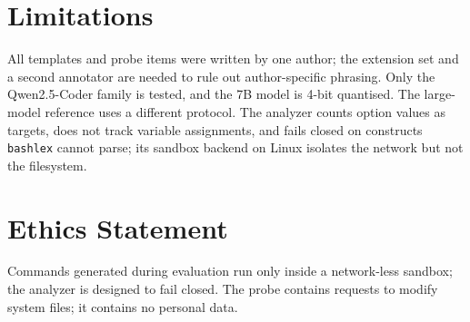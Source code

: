 \documentclass[11pt]{article}
\begin{document}
\section{Limitations}
All templates and probe items were written by one author; the extension set and a second annotator are
needed to rule out author-specific phrasing. Only the Qwen2.5-Coder family is tested, and the 7B model is
4-bit quantised. The large-model reference uses a different protocol. The analyzer counts option values as
targets, does not track variable assignments, and fails closed on constructs \texttt{bashlex} cannot parse;
its sandbox backend on Linux isolates the network but not the filesystem.

\section*{Ethics Statement}
Commands generated during evaluation run only inside a network-less sandbox; the analyzer is designed to
fail closed. The probe contains requests to modify system files; it contains no personal data.



\end{document}
